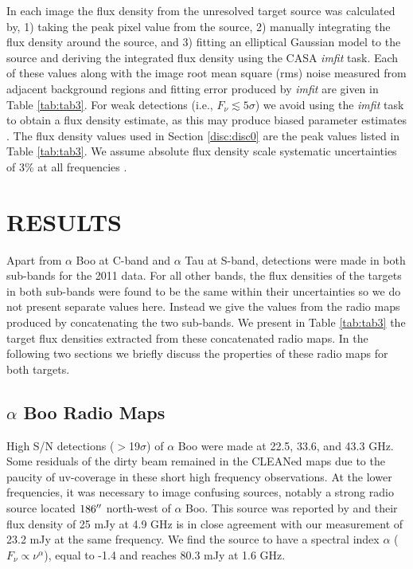 \documentclass[iop]{emulateapj}
\begin{document}
In each image the flux density from the unresolved target source was calculated by, 1) taking the peak pixel value from the source, 2) manually integrating the flux density around the source, and 3) fitting an elliptical Gaussian model to the source and deriving the integrated flux density using the CASA \textit{imfit} task. Each of these values along with the image root mean square (rms) noise measured from adjacent background regions and fitting error produced by \textit{imfit} are given in Table \ref{tab:tab3}. For weak detections (i.e., $F_{\nu} \lesssim 5\sigma$) we avoid using the \textit{imfit} task to obtain a flux density estimate, as this may produce biased parameter estimates \citep{1999ASPC..180.....T}. The flux density values used in Section \ref{disc:disc0} are the peak values listed in Table \ref{tab:tab3}. We assume absolute flux density scale systematic uncertainties of  3\% at all frequencies \citep{2013ApJS..204...19P}.

\section{RESULTS} 

Apart from $\alpha$ Boo at C-band and $\alpha$ Tau at S-band, detections were made in both sub-bands for the 2011 data. For all other bands, the flux densities of the targets in both sub-bands were found to be the same within their uncertainties so we do not present separate values here. Instead we give the values from the radio maps produced by concatenating the two sub-bands. We present in Table \ref{tab:tab3} the target flux densities extracted from these concatenated radio maps. In the following two sections we briefly discuss the properties of these radio maps for both targets.

\subsection{$\alpha$ Boo Radio Maps} \label{results1} 
High S/N detections ($>$19$\sigma$) of $\alpha$ Boo were made at 22.5, 33.6, and 43.3 GHz. Some residuals of the dirty beam remained in the CLEANed maps due to the paucity of uv-coverage in these short high frequency observations. At the lower frequencies, it was necessary to image confusing sources, notably a strong radio source located $186\mbox{$^{\prime\prime}$}$ north-west of $\alpha$ Boo. This source was reported by \cite{1986AJ.....91..602D} and their flux density of 25 mJy at 4.9 GHz is in close agreement with our measurement of 23.2 mJy at the same frequency. We find the source to have a spectral index $\alpha$ ($F_{\nu} \propto \nu ^{\alpha}$), equal to -1.4 and reaches 80.3 mJy at 1.6 GHz.
\end{document}
